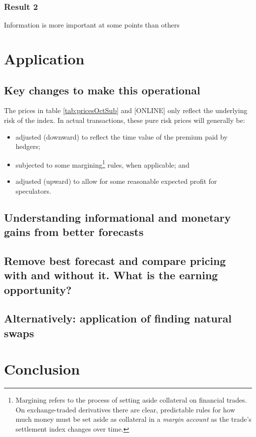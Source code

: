 \documentclass[authoryear]{article}
\begin{document}
\subsubsection{Result 2}
Information is more important at some points than others



\section{Application}
\subsection{Key changes to make this operational}
The prices in table \ref{tab:pricesOctSub} and [ONLINE] only reflect the underlying risk of the index. In actual transactions, these pure risk prices will generally be:
\begin{itemize}
\item adjusted (downward) to reflect the time value of the premium paid by hedgers;
\item subjected to some margining\footnote{Margining refers to the process of setting aside collateral on financial trades. On exchange-traded derivatives there are clear, predictable rules for how much money must be set aside as collateral in a \emph{margin account} as the trade's settlement index changes over time.} rules, when applicable; and
\item adjusted (upward) to allow for some reasonable expected profit for speculators.
\end{itemize}

\subsection{Understanding informational and monetary gains from better forecasts}

\subsection{Remove best forecast and compare pricing with and without it. What is the earning opportunity?}

\subsection{Alternatively: application of finding natural swaps}

\section{Conclusion}
\end{document}
